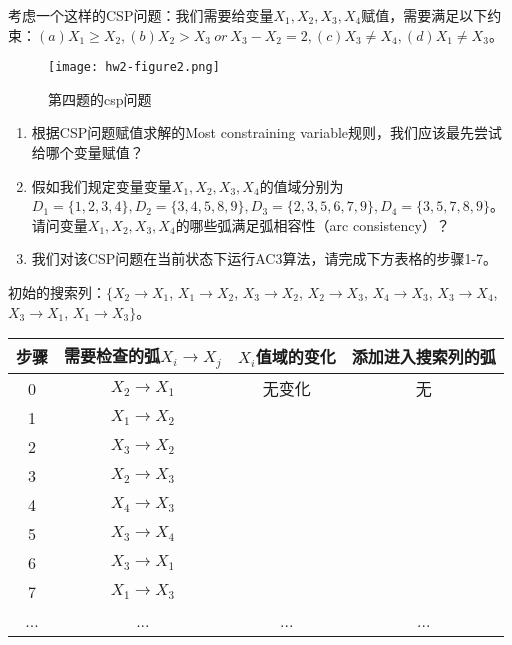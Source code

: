     \begin{problem}
        \indent 考虑一个这样的CSP问题：我们需要给变量\textit{$X_1, X_2, X_3, X_4$}赋值，需要满足以下约束：$(a)X_1\geq X_2, (b)X_2>X_3\ or\  X_3-X_2=2, (c)X_3\neq X_4, (d)X_1\neq X_3$。

\begin{figure}[H]
  \centering
  \texttt{[image: hw2-figure2.png]}
  \caption{第四题的csp问题}
  \label{hw2-figure2}
\end{figure}

\begin{enumerate}
    \item 根据CSP问题赋值求解的Most constraining variable规则，我们应该最先尝试给哪个变量赋值？
    \item 假如我们规定变量变量\textit{$X_1, X_2, X_3, X_4$}的值域分别为$D_1=\{1,2,3,4\}, D_2=\{3,4,5,8,9\}, D_3=\{2,3,5,6,7,9\}, D_4=\{3,5,7,8,9\}$。请问变量\textit{$X_1, X_2, X_3, X_4$}的哪些弧满足弧相容性（arc consistency）？
    \item 我们对该CSP问题在当前状态下运行AC3算法，请完成下方表格的步骤1-7。
\end{enumerate}

\begin{center}
初始的搜索列：$\{ X_2\rightarrow X_1$, $X_1\rightarrow X_2$, $X_3\rightarrow X_2$, $X_2\rightarrow X_3$, $X_4\rightarrow X_3$, $X_3\rightarrow X_4$, $X_3\rightarrow X_1$, $X_1\rightarrow X_3 \}$。\\
\begin{tabular}{|c|c|c|c|}
    \hline 
     步骤& 需要检查的弧$X_i\rightarrow X_j$ & $X_i$值域的变化 & 添加进入搜索列的弧   \\
     \hline 
     0 & $X_2\rightarrow X_1$ & 无变化  & 无 \\ \hline
     1 & $X_1\rightarrow X_2$ &  & \\ \hline
     2 & $X_3\rightarrow X_2$ &   &   \\ \hline
     3 & $X_2\rightarrow X_3$ &   &  \\ \hline
     4 & $X_4\rightarrow X_3$ &   &  \\ \hline
     5 & $X_3\rightarrow X_4$ &   &  \\ \hline
     6 & $X_3\rightarrow X_1$ &   &  \\ \hline
     7 & $X_1\rightarrow X_3$ &   & \\ \hline
     ...& ... & ... & \qquad \qquad \qquad \quad ... \\ \hline
\end{tabular}\\
\end{center}
    \end{problem}

